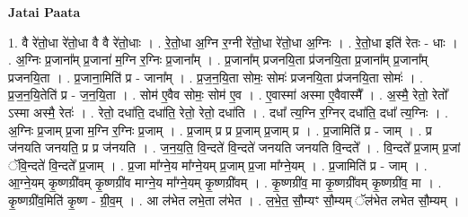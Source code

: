 \documentclass[17pt]{extarticle}
\begin{document}
\textbf{Jatai Paata} \newline

1. वै रे॑तो॒धा रे॑तो॒धा वै वै रे॑तो॒धाः । . रे॒तो॒धा अ॒ग्नि र॒ग्नी रे॑तो॒धा रे॑तो॒धा अ॒ग्निः । . रे॒तो॒धा इति॑ रेतः - धाः । . अ॒ग्निः प्र॒जाना᳚म् प्र॒जाना॑ म॒ग्नि र॒ग्निः प्र॒जाना᳚म् । . प्र॒जाना᳚म् प्रजनयि॒ता प्र॑जनयि॒ता प्र॒जाना᳚म् प्र॒जाना᳚म् प्रजनयि॒ता । . प्र॒जाना॒मिति॑ प्र - जाना᳚म् । . प्र॒ज॒न॒यि॒ता सोमः॒ सोमः॑ प्रजनयि॒ता प्र॑जनयि॒ता सोमः॑ । . प्र॒ज॒न॒यि॒तेति॑ प्र - ज॒न॒यि॒ता । . सोम॑ ए॒वैव सोमः॒ सोम॑ ए॒व । . ए॒वास्मा॑ अस्मा ए॒वैवास्मै᳚ । . अ॒स्मै॒ रेतो॒ रेतो᳚ ऽस्मा अस्मै॒ रेतः॑ । . रेतो॒ दधा॑ति॒ दधा॑ति॒ रेतो॒ रेतो॒ दधा॑ति । . दधा᳚ त्य॒ग्नि र॒ग्निर् दधा॑ति॒ दधा᳚ त्य॒ग्निः । . अ॒ग्निः प्र॒जाम् प्र॒जा म॒ग्नि र॒ग्निः प्र॒जाम् । . प्र॒जाम् प्र प्र प्र॒जाम् प्र॒जाम् प्र । . प्र॒जामिति॑ प्र - जाम् । . प्र ज॑नयति जनयति॒ प्र प्र ज॑नयति । . ज॒न॒य॒ति॒ वि॒न्दते॑ वि॒न्दते॑ जनयति जनयति वि॒न्दते᳚ । . वि॒न्दते᳚ प्र॒जाम् प्र॒जां ॅवि॒न्दते॑ वि॒न्दते᳚ प्र॒जाम् । . प्र॒जा मा᳚ग्ने॒य मा᳚ग्ने॒यम् प्र॒जाम् प्र॒जा मा᳚ग्ने॒यम् । . प्र॒जामिति॑ प्र - जाम् । . आ॒ग्ने॒यम् कृ॒ष्णग्री॑वम् कृ॒ष्णग्री॑व माग्ने॒य मा᳚ग्ने॒यम् कृ॒ष्णग्री॑वम् । . कृ॒ष्णग्री॑व॒ मा कृ॒ष्णग्री॑वम् कृ॒ष्णग्री॑व॒ मा । . कृ॒ष्णग्री॑व॒मिति॑ कृ॒ष्ण - ग्री॒व॒म् । . आ ल॑भेत लभे॒ता ल॑भेत । . ल॒भे॒त॒ सौ॒म्यꣳ सौ॒म्यम् ॅल॑भेत लभेत सौ॒म्यम् । \newline
\end{document}
